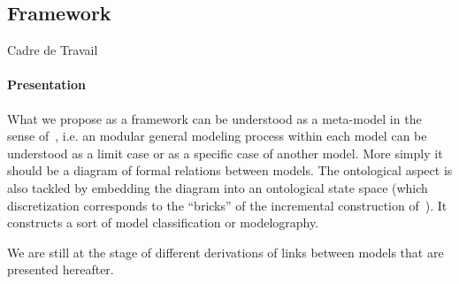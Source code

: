 \subsection{Framework}{Cadre de Travail}


\paragraph{Presentation}
What we propose as a framework can be understood as a meta-model in the sense of~\cite{cottineau2015incremental}, i.e. an modular general modeling process within each model can be understood as a limit case or as a specific case of another model. More simply it should be a diagram of formal relations between models. The ontological aspect is also tackled by embedding the diagram into an ontological state space (which discretization corresponds to the ``bricks'' of the incremental construction of~\cite{cottineau2015incremental}). It constructs a sort of model classification or modelography.

We are still at the stage of different derivations of links between models that are presented hereafter.









